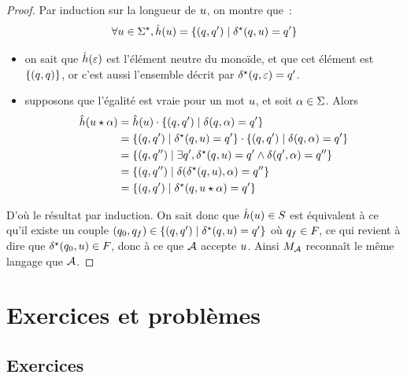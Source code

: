 \begin{proof}
  Par induction sur la longueur de $u$, on montre que~:
  \[\forall u\in \Sigma^{\star}, \hat{h}(u) =
  \left\{ (q_{},q_{}') \;\middle\vert\; \delta_{}^{\star}(q_{},u) = q_{}' \right\}\]
  \begin{itemize}
  \item on sait que $\hat{h}(\varepsilon)$ est l'élément neutre du monoïde,
    et que cet élément est $\{(q_{},q_{})\}$, or c'est aussi l'ensemble décrit
    par $\delta_{}^{\star}(q_{},\varepsilon) = q_{}'$.
  \item supposons que l'égalité est vraie pour un mot $u$, et soit
    $\alpha \in \Sigma$. Alors
    \begin{align*}
      \hat{h}(u\mathbin{\star}\alpha)
      &= \hat{h}(u) \mathbin{\cdot}
      \left\{ (q_{},q_{}') \;\middle\vert\; \delta_{}(q_{},\alpha) = q_{}' \right\}\\
      &= \left\{ (q_{},q_{}') \;\middle\vert\; \delta_{}^{\star}(q_{},u) = q_{}' \right\}\mathbin{\cdot}
      \left\{ (q_{},q_{}') \;\middle\vert\; \delta_{}(q_{},\alpha) = q_{}' \right\}\\
      &= \left\{ (q_{},q_{}'') \;\middle\vert\; \exists q_{}',
      \delta_{}^{\star}(q_{},u) = q_{}' \land \delta_{}(q_{}',\alpha) = q_{}'' \right\}\\
      &= \left\{ (q_{},q_{}'') \;\middle\vert\; \delta_{}(\delta_{}^{\star}(q_{},u),\alpha) = q_{}'' \right\}\\
      &= \left\{ (q_{},q_{}') \;\middle\vert\; \delta_{}^{\star}(q_{},u\mathbin{\star} \alpha) = q_{}' \right\}
    \end{align*}
  \end{itemize}
  D'où le résultat par induction. On sait donc que $\hat{h}(u) \in S$ est
  équivalent à ce qu'il existe un couple
  $(q_{0},q_{f}) \in \left\{ (q_{},q_{}') \;\middle\vert\; \delta_{}^{\star}(q_{},u) = q_{}' \right\}$
  où $q_{f} \in F_{}$, ce qui revient à dire que
  $\delta_{}^{\star}(q_{0},u) \in F_{}$, donc à ce que $\mathcal{A}$ accepte $u$.
  Ainsi $M_{\mathcal{A}}$ reconnaît le même langage que $\mathcal{A}$.
\end{proof}

\clearpage

\section{Exercices et problèmes}

\subsection{Exercices}

